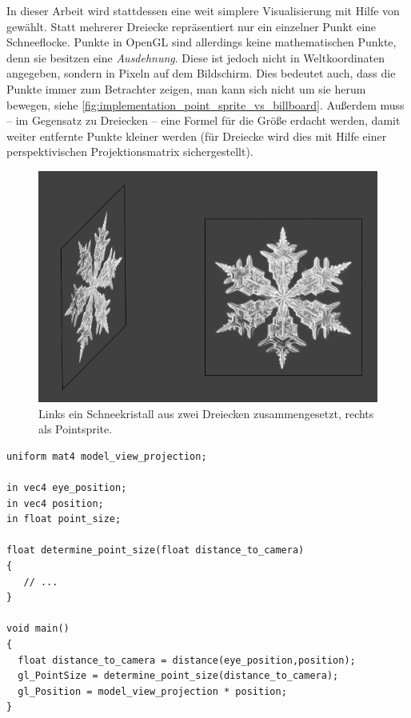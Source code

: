 In dieser Arbeit wird stattdessen eine weit simplere Visualisierung
mit Hilfe von  gewählt. Statt mehrerer
Dreiecke repräsentiert nur ein einzelner Punkt eine
Schneeflocke. Punkte in OpenGL sind allerdings keine mathematischen
Punkte, denn sie besitzen eine \emph{Ausdehnung}. Diese ist jedoch
nicht in Weltkoordinaten angegeben, sondern in Pixeln auf dem
Bildschirm. Dies bedeutet auch, dass die Punkte immer zum Betrachter
zeigen, man kann sich nicht um sie herum bewegen, siehe
\autoref{fig:implementation_point_sprite_vs_billboard}. Außerdem muss
-- im Gegensatz zu Dreiecken -- eine Formel für die Größe erdacht
werden, damit weiter entfernte Punkte kleiner werden (für Dreiecke
wird dies mit Hilfe einer perspektivischen Projektionsmatrix
sichergestellt).

\begin{figure}[ht]
    \centering
    \includegraphics{images/point_sprite_vs_billboard}
    \caption{Links ein Schneekristall aus zwei Dreiecken zusammengesetzt, rechts als Pointsprite.}
    \label{fig:implementation_point_sprite_vs_billboard}
\end{figure}

\begin{lstlisting}[float=tp,caption={Der zu Pointsprites gehörige Vertexshader},label=lst:implementation_point_sprite_vertex_shader]
uniform mat4 model_view_projection;

in vec4 eye_position;
in vec4 position;
in float point_size;

float determine_point_size(float distance_to_camera)
{
   // ...
}

void main()
{
  float distance_to_camera = distance(eye_position,position);
  gl_PointSize = determine_point_size(distance_to_camera);
  gl_Position = model_view_projection * position;
}
\end{lstlisting}


